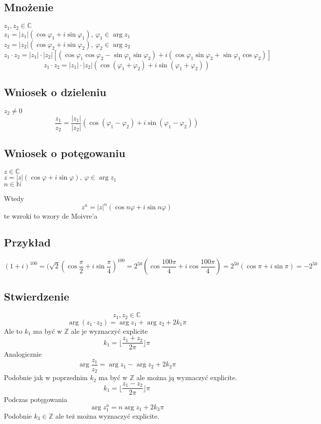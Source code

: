\documentclass[11pt]{article}
\begin{document}
\subsection{Mnożenie}
$ z_1,z_2 \in \mathbb{C}$ \\
$ z_1 = |z_1|(\cos{\varphi_1} + i\sin{\varphi_1}),\ \varphi_1 \in \arg z_1$\\
$ z_2 = |z_2|(\cos{\varphi_2} + i\sin{\varphi_2}),\ \varphi_2 \in \arg z_2$\\
$$ z_1 \cdot z_2 = |z_1| \cdot |z_2|\left[ ( \cos{\varphi_1}\cos{\varphi_2} - \sin{\varphi_1}\sin{\varphi_2}) + i(\cos{\varphi_1}\sin{\varphi_2} + \sin{\varphi_1}\cos{\varphi_2})\right]$$
$$ z_1 \cdot z_2 = |z_1| \cdot |z_2|( \cos{(\varphi_1 + \varphi_2)} + i \sin{(\varphi_1 + \varphi_2)})$$

\subsection{Wniosek o dzieleniu}
$z_2 \not = 0$
$$\frac{z_1}{z_2} = \frac{|z_1|}{|z_2|}(\cos{(\varphi_1 - \varphi_2)} + i\sin{(\varphi_1 - \varphi_2)})$$
\subsection{Wniosek o potęgowaniu}
$ z \in \mathbb{C}$ \\
$ z = |z|(\cos{\varphi} + i\sin{\varphi}),\ \varphi \in \arg z_1$\\
$n \in \mathbb{N}$

Wtedy
$$ z^n = |z|^n ( \cos{n\varphi} + i\sin{n\varphi}) $$
te wzroki to wzory de Moivre'a

\subsection{Przykład}
$$ (1 + i ) ^{100}  = ( \sqrt{2} ( \cos{\frac{\pi}{2}} + i \sin{\frac{\pi}{4}})^{100} = 2^{50} ( \cos{\frac{100\pi}{4}} + i\cos{\frac{100\pi}{4}}) = 2^{50} ( \cos{\pi} + i \sin{\pi} ) = -2^{50}$$
\subsection{Stwierdzenie}
$$z_1,z_2 \in \mathbb{C}$$
$$\arg(z_1 \cdot z_2 ) = \arg{z_1} + \arg{z_2} + 2k_1\pi $$
Ale to $k_1$ ma być w $\mathbb{Z}$ ale je wyznaczyć explicite
$$ k_1 = \lfloor \frac{z_1 + z_2}{2\pi} \rfloor \pi$$
Analogicznie
$$ \arg{\frac{z_1}{z_2}} = \arg{z_1} - \arg{z_2} + 2k_2 \pi $$
Podobnie jak w poprzednim $k_2$ ma być w $\mathbb{Z}$ ale można ją wyznaczyć explicite.
$$ k_1 = \lfloor \frac{z_1 - z_2}{2\pi} \rfloor \pi$$
Podczas potęgowania
$$ \arg{z_1^n} = n \arg{z_1} + 2k_3\pi $$
Podobnie $k_3 \in \mathbb{Z}$ ale też można wyznaczyć explicite.
\end{document}
